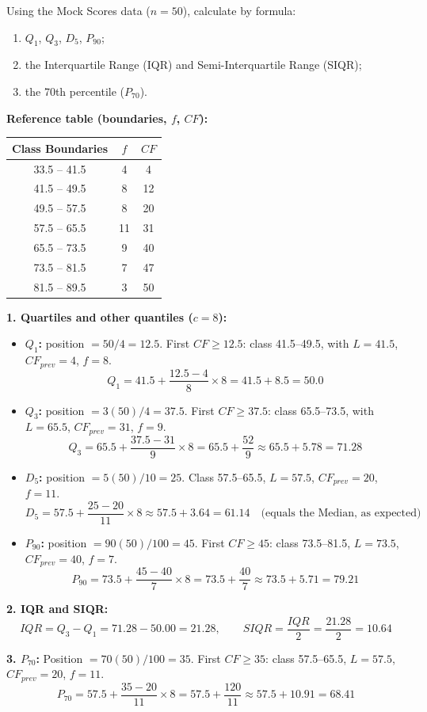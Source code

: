 \documentclass[11pt]{article}
\begin{document}
\begin{exoresolu}
Using the Mock Scores data ($n=50$), calculate by formula:
\begin{enumerate}
    \item $Q_1$, $Q_3$, $D_5$, $P_{90}$;
    \item the Interquartile Range (IQR) and Semi-Interquartile Range (SIQR);
    \item the 70th percentile ($P_{70}$).
\end{enumerate}
\tcblower
\textbf{Reference table (boundaries, $f$, $CF$):}
\begin{center}
\begin{tabular}{|c|c|c|}\hline
\rowcolor{popblueL}
Class Boundaries & $f$ & $CF$ \\ \hline
33.5 -- 41.5 & 4 & 4 \\ \hline
41.5 -- 49.5 & 8 & 12 \\ \hline
49.5 -- 57.5 & 8 & 20 \\ \hline
57.5 -- 65.5 & 11 & 31 \\ \hline
65.5 -- 73.5 & 9 & 40 \\ \hline
73.5 -- 81.5 & 7 & 47 \\ \hline
81.5 -- 89.5 & 3 & 50 \\ \hline
\end{tabular}
\end{center}

\textbf{1. Quartiles and other quantiles ($c=8$):}
\begin{itemize}
    \item \textbf{$Q_1$:} position $= 50/4 = 12.5$. First $CF \ge 12.5$: class 41.5--49.5, with $L=41.5$, $CF_{prev}=4$, $f=8$.
    \[ Q_1 = 41.5 + \frac{12.5 - 4}{8} \times 8 = 41.5 + 8.5 = \mathbf{50.0} \]
    \item \textbf{$Q_3$:} position $= 3(50)/4 = 37.5$. First $CF \ge 37.5$: class 65.5--73.5, with $L=65.5$, $CF_{prev}=31$, $f=9$.
    \[ Q_3 = 65.5 + \frac{37.5 - 31}{9} \times 8 = 65.5 + \frac{52}{9} \approx 65.5 + 5.78 = \mathbf{71.28} \]
    \item \textbf{$D_5$:} position $= 5(50)/10 = 25$. Class 57.5--65.5, $L=57.5$, $CF_{prev}=20$, $f=11$.
    \[ D_5 = 57.5 + \frac{25-20}{11} \times 8 \approx 57.5 + 3.64 = \mathbf{61.14} \quad \text{(equals the Median, as expected)} \]
    \item \textbf{$P_{90}$:} position $= 90(50)/100 = 45$. First $CF \ge 45$: class 73.5--81.5, $L=73.5$, $CF_{prev}=40$, $f=7$.
    \[ P_{90} = 73.5 + \frac{45-40}{7} \times 8 = 73.5 + \frac{40}{7} \approx 73.5 + 5.71 = \mathbf{79.21} \]
\end{itemize}

\textbf{2. IQR and SIQR:}
\[ IQR = Q_3 - Q_1 = 71.28 - 50.00 = \mathbf{21.28}, \qquad SIQR = \frac{IQR}{2} = \frac{21.28}{2} = \mathbf{10.64} \]

\textbf{3. $P_{70}$:}
Position $= 70(50)/100 = 35$. First $CF \ge 35$: class 57.5--65.5, $L=57.5$, $CF_{prev}=20$, $f=11$.
\[ P_{70} = 57.5 + \frac{35-20}{11} \times 8 = 57.5 + \frac{120}{11} \approx 57.5 + 10.91 = \mathbf{68.41} \]
\end{exoresolu}
\end{document}
